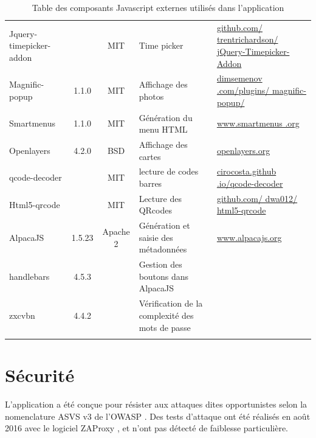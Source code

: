 \begin{longtable}{|>{\raggedright\arraybackslash}p{3cm}|c|c|>{\raggedright\arraybackslash}p{3cm}|>{\raggedright\arraybackslash}p{3cm}|}
Jquery-timepicker-addon &  & MIT & Time picker & \href{https://github.com/trentrichardson/jQuery-Timepicker-Addon}{github.com/ trentrichardson/ jQuery-Timepicker-Addon} \\ 

Magnific-popup & 1.1.0 & MIT & Affichage des photos & \href{http://dimsemenov.com/plugins/magnific-popup/}{dimsemenov .com/plugins/ magnific-popup/}\\ 

Smartmenus & 1.1.0 & MIT & Génération du menu HTML & \href{http://www.smartmenus .org}{www.smartmenus .org} \\ 
 
Openlayers & 4.2.0 & BSD & Affichage des cartes & \href{http://openlayers.org/}{openlayers.org} \\ 

qcode-decoder & & MIT & lecture de codes barres & \href{http://cirocosta.github.io/qcode-decoder/}{cirocosta.github .io/qcode-decoder}\\

Html5-qrcode &  & MIT & Lecture des QRcodes &  \href{https://github.com/dwa012/html5-qrcode}{github.com/ dwa012/ html5-qrcode} \\ 

AlpacaJS & 1.5.23 & Apache 2 & Génération et saisie des métadonnées & 
\href{http://www.alpacajs.org/}{www.alpacajs.org}\\

handlebars & 4.5.3 & & Gestion des boutons dans AlpacaJS & \\
zxcvbn & 4.4.2 & & Vérification de la complexité des mots de passe & \\
\hline
\caption{Table des composants Javascript externes utilisés dans l'application}
\end{longtable} 

\section{Sécurité}

L'application a été conçue pour résister aux attaques dites opportunistes selon la nomenclature ASVS v3 \cite{asvs} de l'OWASP \cite{owasp}. Des tests d'attaque ont été réalisés en août 2016 avec le logiciel ZAProxy \cite{zaproxy}, et n'ont pas détecté de faiblesse particulière.

